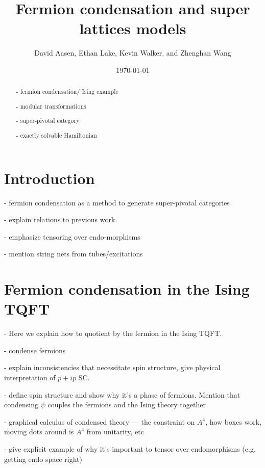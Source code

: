 \documentclass[12pt,a4paper]{article}
\begin{document}
\title{Fermion condensation and super lattices models}
\author{David Aasen, Ethan Lake, Kevin Walker, and Zhenghan Wang}

\date{\today}

\maketitle

\begin{abstract}
- fermion condensation/ Ising example

- modular transformations

- super-pivotal category

- exactly solvable Hamiltonian
\end{abstract}

\tableofcontents

\section{Introduction}

- fermion condensation as a method to generate super-pivotal categories

- explain relations to previous work. 

- emphasize tensoring over endo-morphisms

-  mention string nets from tubes/excitations

\section{Fermion condensation in the Ising TQFT}

- Here we explain how to quotient by the fermion in the Ising TQFT. 

- condense fermions

- explain inconsistencies that necessitate spin structure, give physical interpretation of $p+ip$ SC.

- define spin structure and show why it's a phase of fermions. Mention that condensing $\psi$ couples the fermions and the Ising theory together 

- graphical calculus of condensed theory --- the constraint on $A^4$, how boxes work, moving dots around is $A^4$ from unitarity, etc

- give explicit example of why it's important to tensor over endomorphisms (e.g. getting endo space right)
\end{document}
